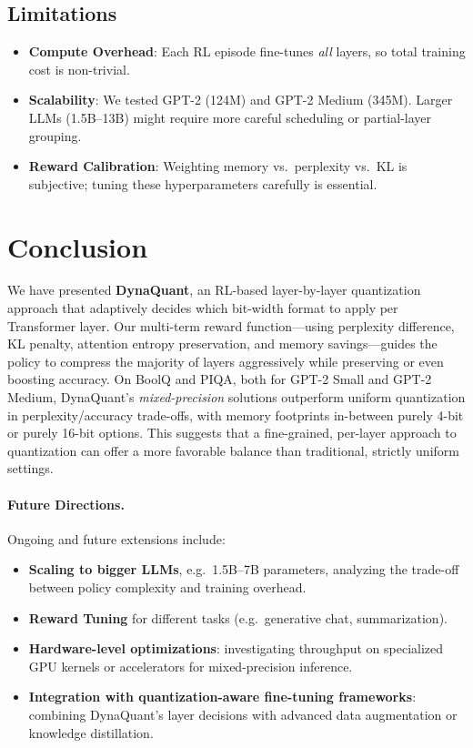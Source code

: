 \documentclass{article}
\begin{document}
	\subsection{Limitations}
	\label{sec:limitations}
	
	\begin{itemize}
		\item \textbf{Compute Overhead}: Each RL episode fine-tunes \emph{all} layers, so total training cost is non-trivial.
		\item \textbf{Scalability}: We tested GPT-2 (124M) and GPT-2 Medium (345M). Larger LLMs (1.5B--13B) might require more careful scheduling or partial-layer grouping.
		\item \textbf{Reward Calibration}: Weighting memory vs.\ perplexity vs.\ KL is subjective; tuning these hyperparameters carefully is essential.
	\end{itemize}
	
	\section{Conclusion}
	\label{sec:conclusion}
	
	We have presented \textbf{DynaQuant}, an RL-based layer-by-layer quantization approach that adaptively decides which bit-width format to apply per Transformer layer. Our multi-term reward function—using perplexity difference, KL penalty, attention entropy preservation, and memory savings—guides the policy to compress the majority of layers aggressively while preserving or even boosting accuracy. On BoolQ and PIQA, both for GPT-2 Small and GPT-2 Medium, DynaQuant’s \emph{mixed-precision} solutions outperform uniform quantization in perplexity/accuracy trade-offs, with memory footprints in-between purely 4-bit or purely 16-bit options. This suggests that a fine-grained, per-layer approach to quantization can offer a more favorable balance than traditional, strictly uniform settings.
		
	
	\paragraph{Future Directions.}
	Ongoing and future extensions include:
	\begin{itemize}
		\item \textbf{Scaling to bigger LLMs}, e.g.\ 1.5B–7B parameters, analyzing the trade-off between policy complexity and training overhead.
		\item \textbf{Reward Tuning} for different tasks (e.g.\ generative chat, summarization).
		\item \textbf{Hardware-level optimizations}: investigating throughput on specialized GPU kernels or accelerators for mixed-precision inference.
		\item \textbf{Integration with quantization-aware fine-tuning frameworks}: combining DynaQuant's layer decisions with advanced data augmentation or knowledge distillation.
	\end{itemize}
	
\end{document}

